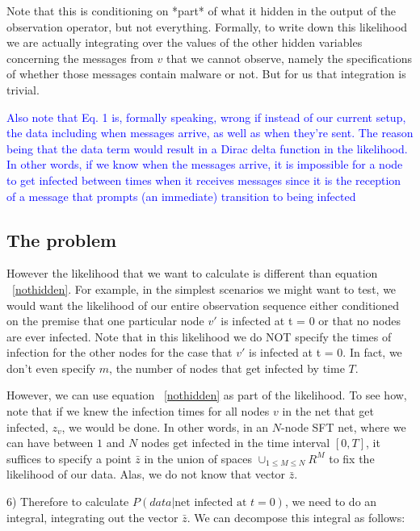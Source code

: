 \documentclass{article}
\begin{document}
	Note that this is conditioning on *part* of what it hidden in the
	output of the observation operator, but not everything.  Formally, to
	write down this likelihood we are actually integrating over the values
	of the other hidden variables concerning the messages from $v$ that we
	cannot observe, namely the specifications of whether those messages
	contain malware or not. But for us that integration is trivial. 

        \textcolor{blue}{Also note that Eq. 1 is, formally speaking,
          wrong if instead of our current setup, the data including when messages arrive, 
          as well as when they're sent. The reason being  that the data term would result
          in a Dirac delta function in the likelihood.  In other words, if we know when the messages
          arrive, it is impossible for a node to get infected between times when it receives messages since it is
          the reception of a message that prompts (an immediate) transition to being infected}

\subsection{The problem}
	
        However the likelihood that we want to calculate is different than 
        equation ~\ref{nothidden}.  For example, in the simplest scenarios we might want
	to test, we would want the likelihood of our entire observation
	sequence either conditioned on the premise that one particular node
	$v'$ is infected at t = 0 or that no nodes are ever infected. 
        Note that in this likelihood we do NOT 
        specify the times of infection for the other nodes for the case that 
        $v'$ is infected at t = 0. In fact, we don't even specify $m$, the number
        of nodes that get infected by time $T$.


	However, we can use equation ~\ref{nothidden} as part of the  likelihood. To see how, 
        note that if we knew the infection times for all nodes $v$ in the net 
        that get infected,  $z_{v}$,  we would be done.  In other words, in an 
        $N$-node SFT net, where we can have between $1$ and $N$ nodes get infected in 
        the time interval $[0, T]$, it suffices to specify a point $\bar{z}$ in the union 
        of spaces $\cup_{1 \le M \le N} R^M$ to fix the likelihood of our data.
        Alas, we do not know that vector $\bar{z}$.


	6) Therefore to calculate  $P(data  | \text{net infected at } t = 0)$, 
        we need to do an integral, integrating out the vector $\bar{z}$. We can 
        decompose this integral as follows:
\end{document}
